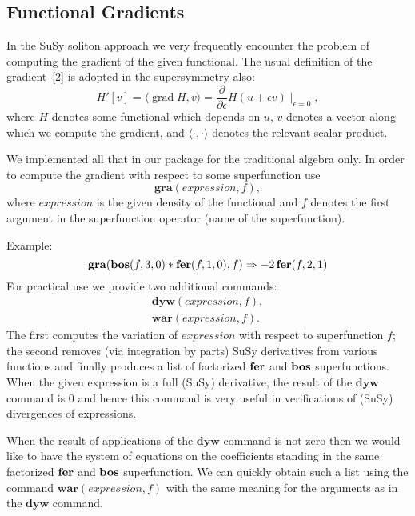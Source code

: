 {\subsection{Functional Gradients}

In the SuSy soliton approach we very frequently encounter the problem
of computing the gradient of the given functional.  The usual
definition of the gradient~\hyperlink{susy2-bib}{[2]} is adopted in the
supersymmetry also:
\begin{equation*}
  H'[v] = \langle \operatorname{grad} H, v \rangle =
  \frac{\partial}{\partial\epsilon} H(u+\epsilon v) \mid_{\epsilon=0},
\end{equation*}
where $H$ denotes some functional which depends on $u$, $v$ denotes a
vector along which we compute the gradient, and
$\langle\cdot,\cdot\rangle$ denotes the relevant scalar product.

We implemented all that in our package for the traditional algebra
only.  In order to compute the gradient with respect to some
superfunction use
\begin{equation*}
  \mathbf{gra}(\mathit{expression},f),
\end{equation*}
where $\mathit{expression}$ is the given density of the functional and
$f$ denotes the first argument in the superfunction operator (name of
the superfunction).

Example:
\begin{equation*}
  \mathbf{gra}(\mathbf{bos}(f,3,0)*\mathbf{fer}(f,1,0),f) \Rightarrow -2\,\mathbf{fer}(f,2,1)
\end{equation*}
For practical use we provide two additional commands:
\begin{gather*}
  \mathbf{dyw}(\mathit{expression},f), \\
  \mathbf{war}(\mathit{expression},f).
\end{gather*}
The first computes the variation of $\mathit{expression}$ with respect
to superfunction $f$; the second removes (via integration by parts)
SuSy derivatives from various functions and finally produces a list of
factorized $\mathbf{fer}$ and $\mathbf{bos}$ superfunctions.  When the given
expression is a full (SuSy) derivative, the result of the
$\mathbf{dyw}$ command is 0 and hence this command is very useful in
verifications of (SuSy) divergences of expressions.

When the result of applications of the $\mathbf{dyw}$ command is not
zero then we would like to have the system of equations on the
coefficients standing in the same factorized $\mathbf{fer}$ and $\mathbf{bos}$
superfunction.  We can quickly obtain such a list using the command
$\mathbf{war}(\mathit{expression},f)$ with the same meaning for the
arguments as in the $\mathbf{dyw}$ command.

}
